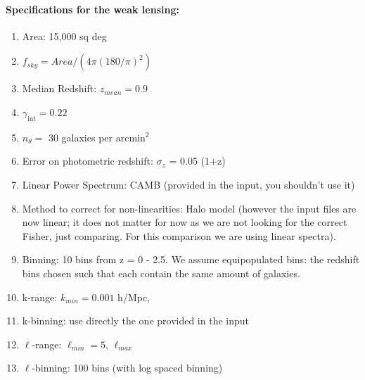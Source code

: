 \paragraph{Specifications for the weak lensing:}
\begin{enumerate}
\item Area: 15,000 sq deg
\item $f_{sky} = Area/(4 \pi (180/\pi)^2)$
\item Median Redshift: $z_{mean} = 0.9$
\item $\gamma_{\mathrm{int}}=0.22$
\item $n_\theta =$ 30 galaxies per $\mathrm{arcmin}^{2}$
\item Error on photometric redshift: $\sigma_z$ = 0.05 (1+z)
\item Linear Power Spectrum: CAMB (provided in the input, you shouldn't use it)
\item Method to correct for non-linearities: Halo model  (however the input files are now linear; it does not matter for now as we are not looking for the correct Fisher, just comparing. For this comparison we are using linear spectra).
\item Binning: 10 bins from z = 0 - 2.5. We assume equipopulated bins: the redshift bins chosen such that each contain
the same amount of galaxies. 
\item k-range: $k_{min}=0.001$ h/Mpc, 
\item k-binning: use directly the one provided in the input
\item $\ell$-range: $\ell_{min}=5$, $\ell_{max}$ 
\item $\ell$-binning: 100 bins (with log spaced binning)
\end{enumerate}

%



